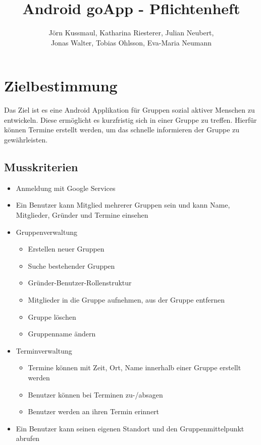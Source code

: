 \documentclass{scrartcl}
\title{Android goApp - Pflichtenheft}
\author{Jörn Kussmaul, Katharina Riesterer, Julian Neubert,\\ Jonas Walter, Tobias Ohlsson, Eva-Maria Neumann}
\begin{document}
		
	

	\maketitle
	\newpage
	
	\tableofcontents
	\newpage
	\section{Zielbestimmung}
	Das Ziel ist es eine \gls{Android} Applikation für Gruppen sozial aktiver Menschen zu entwickeln. Diese ermöglicht es kurzfristig sich in einer Gruppe zu treffen. Hierfür können Termine erstellt werden, um das schnelle informieren der Gruppe zu gewährleisten.
	\subsection{Musskriterien}
	\begin{itemize}
		\item Anmeldung mit \gls{Google Services}
		\item Ein Benutzer kann \gls{Mitglied} mehrerer Gruppen sein und kann Name, Mitglieder, Gründer und Termine einsehen
		\item Gruppenverwaltung
		\begin{itemize}
			\item Erstellen neuer Gruppen
			\item Suche bestehender Gruppen
			\item Gründer-Benutzer-Rollenstruktur
			\item Mitglieder in die Gruppe aufnehmen, aus der Gruppe entfernen
			\item Gruppe löschen
			\item Gruppenname ändern
		\end{itemize}
		\item Terminverwaltung
		\begin{itemize}
			\item Termine können mit Zeit, Ort, Name innerhalb einer Gruppe erstellt werden
			\item Benutzer können bei Terminen zu-/absagen
			\item Benutzer werden an ihren Termin erinnert
		\end{itemize}
		\item Ein Benutzer kann seinen eigenen Standort und den Gruppenmittelpunkt abrufen
	\end{itemize}
\end{document}
